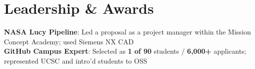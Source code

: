 \documentclass[letterpaper,11pt]{article}
\makeatletter
\newcommand{\resumeItem}[1]{
  \item\small{
    {#1 \vspace{-2pt}}
  }
}
\newcommand{\resumeSubheading}[4]{
  \vspace{-2pt}\item
    \begin{tabular*}{0.97\textwidth}[t]{l@{\extracolsep{\fill}}r}
      \textbf{#1} & #2 \\
      \textit{\small#3} & \textit{\small #4} \\
    \end{tabular*}\vspace{-7pt}
}
\newcommand{\resumeSubHeadingListStart}{\begin{itemize}[leftmargin=0.15in, label={}]}
\newcommand{\resumeSubHeadingListEnd}{\end{itemize}}
\newcommand{\resumeItemListStart}{\begin{itemize}}
\newcommand{\resumeItemListEnd}{\end{itemize}\vspace{-5pt}}
\makeatother
\begin{document}



\section{Leadership \& Awards}
\begin{itemize}[leftmargin=0.15in, label={}]
  \small{\item{
        \textbf{NASA Lucy Pipeline}{: Led a proposal as a project manager within the Mission Concept Academy; used Siemens NX CAD} \\
        \textbf{GitHub Campus Expert}{: Selected as \textbf{1 of 90} students / \textbf{6,000+} applicants; represented UCSC and intro'd students to OSS} \\
        }}
\end{itemize}
\vspace{-10pt}



\end{document}
